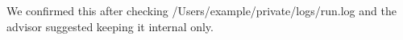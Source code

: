 We confirmed this after checking /Users/example/private/logs/run.log and the advisor suggested keeping it internal only.

